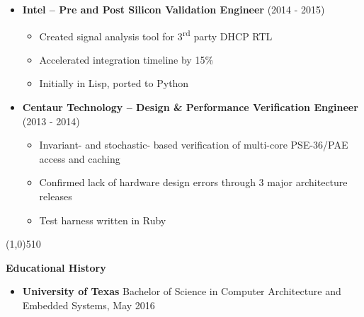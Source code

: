 \documentclass{report}
\newcommand{\cut}{\begin{center} \line(1,0){510} \end{center}}
\begin{document}
\begin{itemize}[label=$\cdot$]
\item \textbf{Intel -- Pre and Post Silicon Validation Engineer} (2014 - 2015)
  \begin{itemize}[label=$\circ$]
  \item Created signal analysis tool for 3\textsuperscript{rd} party DHCP RTL
  \item Accelerated integration timeline by 15\%
  \item Initially in Lisp, ported to Python
  \end{itemize}

\item \textbf{Centaur Technology -- Design \& Performance Verification Engineer} (2013 - 2014)
  \begin{itemize}[label=$\circ$]
  \item Invariant- and stochastic- based verification of multi-core PSE-36/PAE access and caching
  \item Confirmed lack of hardware design errors through 3 major architecture releases
  \item Test harness written in Ruby
  \end{itemize}

\end{itemize}

\cut{}

\textbf{Educational History}
\begin{itemize}[label=$\cdot$]
\item \textbf{University of Texas} Bachelor of Science in Computer Architecture and Embedded Systems, May 2016
\end{itemize}
\end{document}
